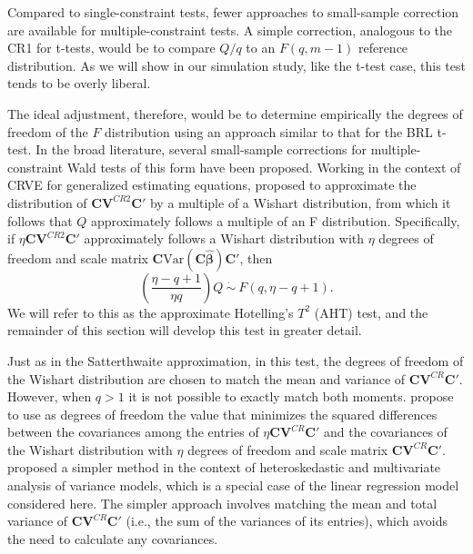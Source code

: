 \documentclass[12pt]{article}
\newcommand{\Var}{\text{Var}}
\newcommand{\bm}{\mathbf}
\newcommand{\bs}{\boldsymbol}
\begin{document}
Compared to single-constraint tests, fewer approaches to small-sample correction are available for multiple-constraint tests. A simple correction, analogous to the CR1 for t-tests, would be to compare $Q / q$ to an $F(q, m - 1)$ reference distribution. As we will show in our simulation study, like the t-test case, this test tends to be overly liberal. 

The ideal adjustment, therefore, would be to determine empirically the degrees of freedom of the $F$ distribution using an approach similar to that for the BRL t-test. In the broad literature, several small-sample corrections for multiple-constraint Wald tests of this form have been proposed.  Working in the context of CRVE for generalized estimating equations, \cite{Pan2002small} proposed to approximate the distribution of $\bm{C}\bm{V}^{CR2} \bm{C}'$ by a multiple of a Wishart distribution, from which it follows that $Q$ approximately follows a multiple of an F distribution. Specifically, if $\eta \bm{C}\bm{V}^{CR2} \bm{C}'$ approximately follows a Wishart distribution with $\eta$ degrees of freedom and scale matrix $\bm{C} \Var\left(\bm{C}\bs{\hat\beta}\right)\bm{C}'$, then 
\begin{equation}
\label{eq:AHT}
\left(\frac{\eta - q + 1}{\eta q}\right) Q \ \dot\sim \ F(q, \eta - q + 1).
\end{equation}
We will refer to this as the approximate Hotelling's $T^2$ (AHT) test, and the remainder of this section will develop this test in greater detail.

Just as in the Satterthwaite approximation, in this test, the degrees of freedom of the Wishart distribution are chosen to match the mean and variance of $\bm{C}\bm{V}^{CR} \bm{C}'$. However, when $q > 1$ it is not possible to exactly match both moments. \cite{Pan2002small} propose to use as degrees of freedom the value that minimizes the squared differences between the covariances among the entries of $\eta \bm{C}\bm{V}^{CR}\bm{C}'$ and the covariances of the Wishart distribution with $\eta$ degrees of freedom and scale matrix $\bm{C}\bm{V}^{CR}\bm{C}'$. \citet{Zhang2012two-wayANOVA, Zhang2012MANOVA, Zhang2013tests} proposed a simpler method in the context of heteroskedastic and multivariate analysis of variance models, which is a special case of the linear regression model considered here. 
The simpler approach involves matching the mean and total variance of $\bm{C}\bm{V}^{CR}\bm{C}'$ (i.e., the sum of the variances of its entries), which avoids the need to calculate any covariances.
\end{document}
